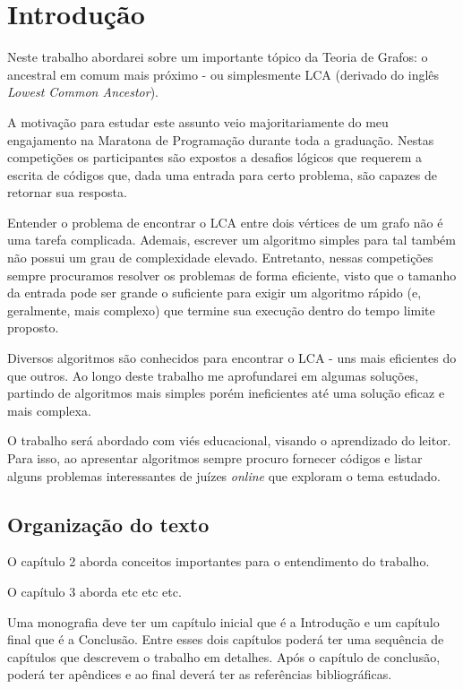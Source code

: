 \chapter{Introdução}
\label{cap:introducao}


Neste trabalho abordarei sobre um importante tópico da Teoria de Grafos: o ancestral 
em comum mais próximo - ou simplesmente LCA (derivado do inglês \emph{Lowest Common 
Ancestor}).

A motivação para estudar este assunto veio majoritariamente do meu engajamento na 
Maratona de Programação durante toda a graduação. Nestas competições os participantes 
são expostos a desafios lógicos que requerem a escrita de códigos que, dada uma 
entrada para certo problema, são capazes de retornar sua resposta.

Entender o problema de encontrar o LCA entre dois vértices de um grafo não é uma 
tarefa complicada. Ademais, escrever um algoritmo simples para tal também não possui 
um grau de complexidade elevado. Entretanto, nessas competições sempre procuramos 
resolver os problemas de forma eficiente, visto que o tamanho da entrada pode ser 
grande o suficiente para exigir um algoritmo rápido (e, geralmente, mais complexo) 
que termine sua execução dentro do tempo limite proposto.

Diversos algoritmos são conhecidos para encontrar o LCA - uns mais eficientes do 
que outros. Ao longo deste trabalho me aprofundarei em algumas soluções, partindo 
de algoritmos mais simples porém ineficientes até uma solução eficaz e mais complexa.

O trabalho será abordado com viés educacional, visando o aprendizado do leitor. 
Para isso, ao apresentar algoritmos sempre procuro fornecer códigos e listar 
alguns problemas interessantes de juízes \emph{online} que exploram o tema estudado.


\section{Organização do texto}

O capítulo 2 aborda conceitos importantes para o entendimento do trabalho.

O capítulo 3 aborda etc etc etc.



\iffalse
Uma monografia deve ter um capítulo inicial que é a Introdução e um
capítulo final que é a Conclusão. Entre esses dois capítulos poderá
ter uma sequência de capítulos que descrevem o trabalho em detalhes.
Após o capítulo de conclusão, poderá ter apêndices e ao final deverá
ter as referências bibliográficas.


